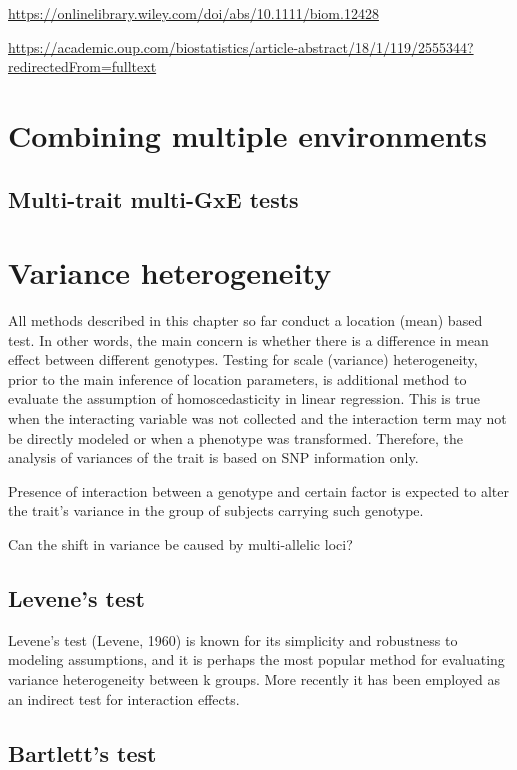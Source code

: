 \documentclass[]{book}
\theoremstyle{definition}
\theoremstyle{definition}
\theoremstyle{definition}
\theoremstyle{remark}
\begin{document}
\url{https://onlinelibrary.wiley.com/doi/abs/10.1111/biom.12428}

\url{https://academic.oup.com/biostatistics/article-abstract/18/1/119/2555344?redirectedFrom=fulltext}

\section{Combining multiple
environments}\label{combining-multiple-environments}

\subsection{Multi-trait multi-GxE
tests}\label{multi-trait-multi-gxe-tests}

\section{Variance heterogeneity}\label{variance-heterogeneity}

All methods described in this chapter so far conduct a location (mean)
based test. In other words, the main concern is whether there is a
difference in mean effect between different genotypes. Testing for scale
(variance) heterogeneity, prior to the main inference of location
parameters, is additional method to evaluate the assumption of
homoscedasticity in linear regression. This is true when the interacting
variable was not collected and the interaction term may not be directly
modeled or when a phenotype was transformed. Therefore, the analysis of
variances of the trait is based on SNP information only.

Presence of interaction between a genotype and certain factor is
expected to alter the trait's variance in the group of subjects carrying
such genotype.

Can the shift in variance be caused by multi-allelic loci?

\subsection{Levene's test}\label{levenes-test}

Levene's test (Levene, 1960) is known for its simplicity and robustness
to modeling assumptions, and it is perhaps the most popular method for
evaluating variance heterogeneity between k groups. More recently it has
been employed as an indirect test for interaction effects.

\subsection{Bartlett's test}\label{bartletts-test}
\end{document}
